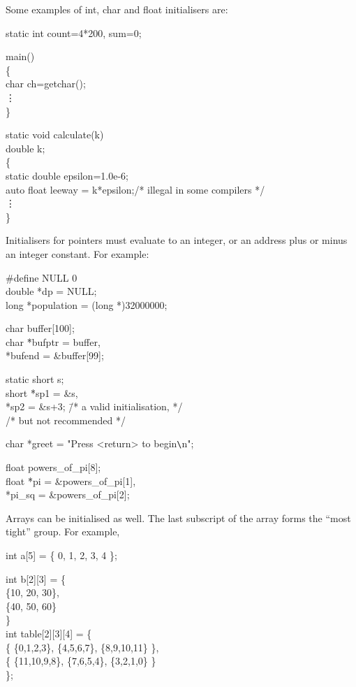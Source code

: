     Some examples of {\cd int}, {\cd char} and {\cd float}
initialisers are:
\begin{code}
  static int count=4*200, sum=0; \addVspace

  main() \\
  \{ \+\\
       char ch=getchar(); \\
       \vdots \-\\
  \} \addVspace

  static void calculate(k) \\
  \> double k; \\
  \{ \+\\
       static double epsilon=1.0e-6; \\
       auto float leeway = k*epsilon;\tab /* illegal in some compilers */ \\
       \vdots \-\\
  \} 
\end{code}
\noindent
     Initialisers for pointers must 
evaluate to an integer, or
an address plus or minus an integer constant. For example:
\begin{code}
  \#define NULL 0 				\\
  double *dp = NULL; 				\\
  long *population = (long *)32000000; 		\addVspace

  char buffer[100]; 		\\
  char \=*bufptr = buffer,		\\
    \>   *bufend = \&buffer[99];	\addVspace

  static short s; 		\\
  short \=*sp1 = \&s,		\\
    \>    *sp2 = \&s+3; \tab\=/* a valid initialisation, */ \\
 \> \>                        /* but not recommended */	\addVspace

  char *greet = "Press <return> to begin\verb+\+n";	\addVspace

  float powers\_of\_pi[8]; 	\\
  float \=*pi = \&powers\_of\_pi[1], 	\\
   \>     *pi\_sq = \&powers\_of\_pi[2]; 
\end{code}
\noindent
     Arrays can  be initialised as well. 
The last subscript of the
array forms the ``most tight'' group.  For example,
\begin{code}
  int a[5] = \{ 0, 1, 2, 3, 4 \};	\addVspace

  int b[2][3] = \{					\\ 
  \> \{10, 20, 30\},					\\
  \> \{40, 50, 60\}					\\
  \} 										\\
  int table[2][3][4] = \{			\\
  \> \{ \{0,1,2,3\}, \{4,5,6,7\}, \{8,9,10,11\} \}, \\
  \> \{ \{11,10,9,8\}, \{7,6,5,4\}, \{3,2,1,0\} \}  \\ 
  \}; 
\end{code}
